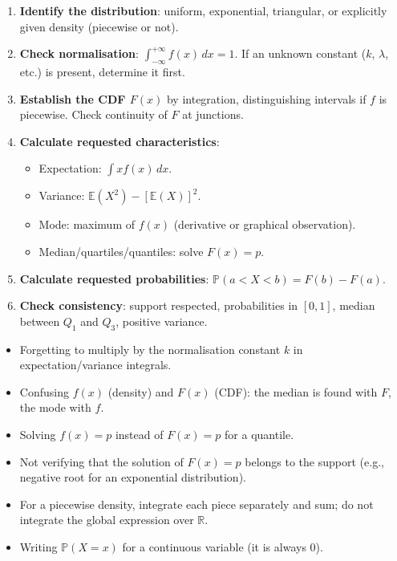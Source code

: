 \documentclass[11pt]{article}
\begin{document}
\begin{methode}
\begin{enumerate}
    \item \textbf{Identify the distribution}: uniform, exponential, triangular, or explicitly given density (piecewise or not).
    \item \textbf{Check normalisation}: $\int_{-\infty}^{+\infty} f(x)\,dx = 1$. If an unknown constant ($k$, $\lambda$, etc.) is present, determine it first.
    \item \textbf{Establish the CDF $F(x)$} by integration, distinguishing intervals if $f$ is piecewise. Check continuity of $F$ at junctions.
    \item \textbf{Calculate requested characteristics}:
    \begin{itemize}
        \item Expectation: $\int x f(x)\,dx$.
        \item Variance: $\mathbb{E}(X^2) - [\mathbb{E}(X)]^2$.
        \item Mode: maximum of $f(x)$ (derivative or graphical observation).
        \item Median/quartiles/quantiles: solve $F(x)=p$.
    \end{itemize}
    \item \textbf{Calculate requested probabilities}: $\mathbb{P}(a<X<b)=F(b)-F(a)$.
    \item \textbf{Check consistency}: support respected, probabilities in $[0,1]$, median between $Q_1$ and $Q_3$, positive variance.
\end{enumerate}
\end{methode}

\begin{attention}
\begin{itemize}
    \item Forgetting to multiply by the normalisation constant $k$ in expectation/variance integrals.
    \item Confusing $f(x)$ (density) and $F(x)$ (CDF): the median is found with $F$, the mode with $f$.
    \item Solving $f(x)=p$ instead of $F(x)=p$ for a quantile.
    \item Not verifying that the solution of $F(x)=p$ belongs to the support (e.g., negative root for an exponential distribution).
    \item For a piecewise density, integrate each piece separately and sum; do not integrate the global expression over $\mathbb{R}$.
    \item Writing $\mathbb{P}(X=x)$ for a continuous variable (it is always 0).
\end{itemize}
\end{attention}
\end{document}
